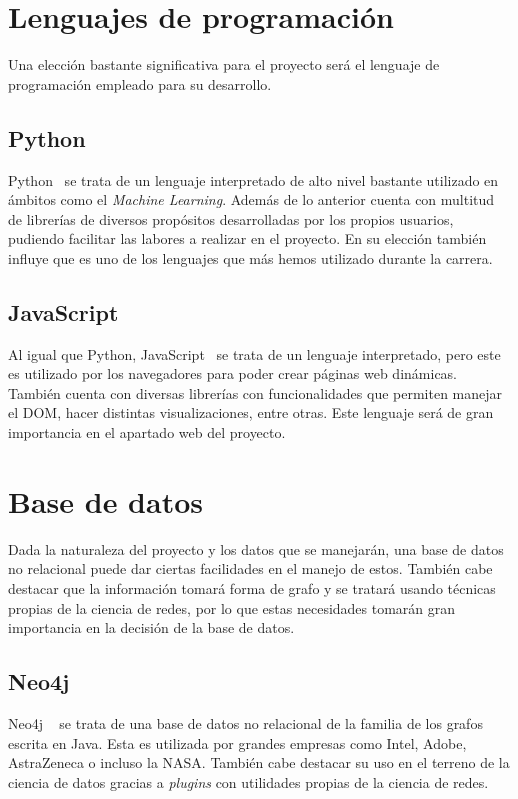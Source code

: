 \section{Lenguajes de programación}

Una elección bastante significativa para el proyecto será el lenguaje de programación empleado
para su desarrollo.
\subsection{Python}
Python~\cite{Python} se trata de un lenguaje interpretado de alto nivel bastante utilizado en ámbitos como el \textit{Machine Learning}.
Además de lo anterior cuenta con multitud de librerías de diversos propósitos desarrolladas por los propios usuarios, pudiendo
facilitar las labores a realizar en el proyecto. En su elección también influye que es uno de los lenguajes que más hemos
utilizado durante la carrera.
\subsection{JavaScript}
Al igual que Python, JavaScript~\cite{JS} se trata de un lenguaje interpretado, pero este es utilizado por los
navegadores para poder crear páginas web dinámicas. También cuenta con diversas librerías con funcionalidades
que permiten manejar el DOM, hacer distintas visualizaciones, entre otras. Este lenguaje será de gran importancia
en el apartado web del proyecto.

\section{Base de datos}

Dada la naturaleza del proyecto y los datos que se manejarán, una base de datos no relacional
puede dar ciertas facilidades en el manejo de estos. También cabe destacar que la información
tomará forma de grafo y se tratará usando técnicas propias de la ciencia de redes, por lo que 
estas necesidades tomarán gran importancia en la decisión de la base de datos.


\subsection{Neo4j}

Neo4j ~\cite{neo4j} se trata de una base de datos no relacional de la familia de los grafos escrita en Java. Esta
es utilizada por grandes empresas como Intel, Adobe, AstraZeneca o incluso la NASA. También cabe destacar
su uso en el terreno de la ciencia de datos gracias a \textit{plugins} con utilidades propias de la ciencia de redes.

